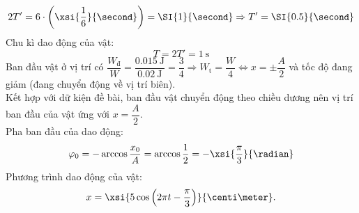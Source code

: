 \begin{ex}
{		$$2T'=6\cdot\left(\xsi{\dfrac{1}{6}}{\second}\right)=\SI{1}{\second}\Rightarrow T'=\SI{0.5}{\second}$$
		Chu kì dao động của vật:
		$$T=2T'=\SI{1}{\second}$$
		Ban đầu vật ở vị trí có $\dfrac{W_\text{đ}}{W}=\dfrac{\SI{0.015}{\joule}}{\SI{0.02}{\joule}}=\dfrac{3}{4}\Rightarrow W_\text{t}=\dfrac{W}{4}\Leftrightarrow x=\pm\dfrac{A}{2}$ và tốc độ đang giảm (đang chuyển động về vị trí biên).\\
		Kết hợp với dữ kiện đề bài, ban đầu vật chuyển động theo chiều dương nên vị trí ban đầu của vật ứng với $x=\dfrac{A}{2}$.\\
		Pha ban đầu của dao động:
		$$\varphi_0=-\arccos\dfrac{x_0}{A}=\arccos\dfrac{1}{2}=-\xsi{\dfrac{\pi}{3}}{\radian}$$
		Phương trình dao động của vật:
		$$x=\xsi{5\cos\left(2\pi t-\dfrac{\pi}{3}\right)}{\centi\meter}.$$}
\end{ex}
